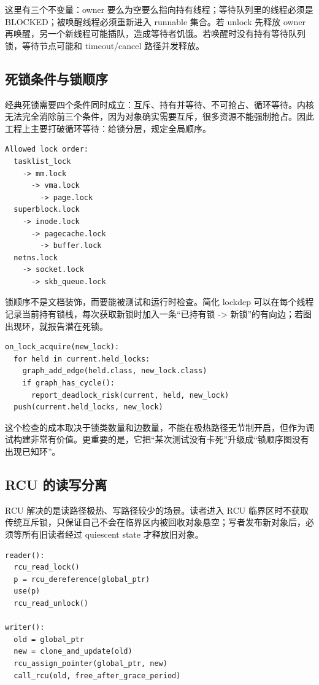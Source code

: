 这里有三个不变量：owner 要么为空要么指向持有线程；等待队列里的线程必须是 BLOCKED；被唤醒线程必须重新进入 runnable 集合。若 unlock 先释放 owner 再唤醒，另一个新线程可能插队，造成等待者饥饿。若唤醒时没有持有等待队列锁，等待节点可能和 timeout/cancel 路径并发释放。

\subsection{死锁条件与锁顺序}

经典死锁需要四个条件同时成立：互斥、持有并等待、不可抢占、循环等待。内核无法完全消除前三个条件，因为对象确实需要互斥，很多资源不能强制抢占。因此工程上主要打破循环等待：给锁分层，规定全局顺序。

\begin{lstlisting}
Allowed lock order:
  tasklist_lock
    -> mm.lock
      -> vma.lock
        -> page.lock
  superblock.lock
    -> inode.lock
      -> pagecache.lock
        -> buffer.lock
  netns.lock
    -> socket.lock
      -> skb_queue.lock
\end{lstlisting}

锁顺序不是文档装饰，而要能被测试和运行时检查。简化 lockdep 可以在每个线程记录当前持有锁栈，每次获取新锁时加入一条“已持有锁 -> 新锁”的有向边；若图出现环，就报告潜在死锁。

\begin{lstlisting}
on_lock_acquire(new_lock):
  for held in current.held_locks:
    graph_add_edge(held.class, new_lock.class)
    if graph_has_cycle():
      report_deadlock_risk(current, held, new_lock)
  push(current.held_locks, new_lock)
\end{lstlisting}

这个检查的成本取决于锁类数量和边数量，不能在极热路径无节制开启，但作为调试构建非常有价值。更重要的是，它把“某次测试没有卡死”升级成“锁顺序图没有出现已知环”。

\subsection{RCU 的读写分离}

RCU 解决的是读路径极热、写路径较少的场景。读者进入 RCU 临界区时不获取传统互斥锁，只保证自己不会在临界区内被回收对象悬空；写者发布新对象后，必须等所有旧读者经过 quiescent state 才释放旧对象。

\begin{lstlisting}
reader():
  rcu_read_lock()
  p = rcu_dereference(global_ptr)
  use(p)
  rcu_read_unlock()

writer():
  old = global_ptr
  new = clone_and_update(old)
  rcu_assign_pointer(global_ptr, new)
  call_rcu(old, free_after_grace_period)
\end{lstlisting}

